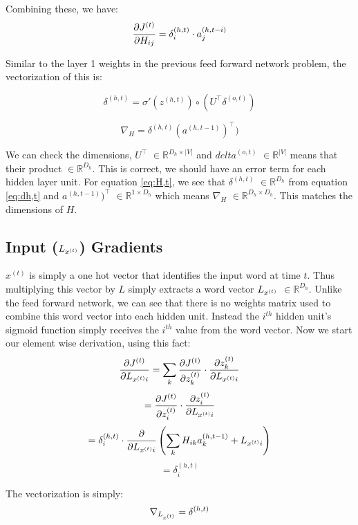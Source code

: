 \documentclass[]{article}
\newcommand{\deriv}[2]{%
	\ensuremath{\frac{\partial {#1}}{\partial {#2}}}}
\newcommand{\slayer}[3]{ %
	\ensuremath{{#1}^{(#2)}_{#3}}}
\newcommand{\vlayer}[2]{ %
	\ensuremath{{#1}^{(#2)}}}
\newcommand{\reals}[1]{ %
	\ensuremath{\in \mathbb{R}^{#1}}}
\begin{document}
Combining these, we have:
$$\deriv{\vlayer{J}{t}}{H_{ij}} = \slayer{\delta}{h,t}{i} \cdot \slayer{a}{h,t-i}{j}$$

Similar to the layer 1 weights in the previous feed forward network problem, the vectorization of this is:

\begin{equation} \label{eq:dh,t}
\vlayer{\delta}{h,t} = \sigma'(\vlayer{z}{h,t}) \circ (U^\top \vlayer{\delta}{o,t})
\end{equation}

\begin{equation} \label{eq:H,t}
\nabla_H = \vlayer{\delta}{h,t} (\vlayer{a}{h,t-1})^\top)
\end{equation}

We can check the dimensions, $U^\top$\reals{D_h\times|V|} and\vlayer{delta}{o,t}\reals{|V|} means that their product\reals{D_h}. This is correct, we should have an error term for each hidden layer unit. For equation \ref{eq:H,t}, we see that \vlayer{\delta}{h,t}\reals{D_h} from equation \ref{eq:dh,t} and $\vlayer{a}{h,t-1})^\top$\reals{1 \times D_h} which means $\nabla_H$\reals{D_h \times D_h}. This matches the dimensions of $H$.

\subsection{Input ($L_{\vlayer{x}{t}}$) Gradients}
\vlayer{x}{t} is simply a one hot vector that identifies the input word at time $t$. Thus multiplying this vector by $L$ simply extracts a word vector $L_{\vlayer{x}{t}}$\reals{D_h}. Unlike the feed forward network, we can see that there is no weights matrix used to combine this word vector into each hidden unit. Instead the $i^{th}$ hidden unit's sigmoid function simply receives the $i^{th}$ value from the word vector. Now we start our element wise derivation, using this fact:
$$\deriv{\vlayer{J}{t}}{L_{\vlayer{x}{t}i}} = \sum_k \deriv{\vlayer{J}{t}}{\slayer{z}{t}{k}} \cdot \deriv{\slayer{z}{t}{k}}{L_{\vlayer{x}{t}i}}$$
$$ = \deriv{\vlayer{J}{t}}{\slayer{z}{t}{i}} \cdot \deriv{\slayer{z}{t}{i}}{L_{\vlayer{x}{t}i}}$$
$$ = \slayer{\delta}{h,t}{i} \cdot \deriv{}{L_{\vlayer{x}{t}i}}\left( \sum_k H_{ik}\slayer{a}{h,t-1}{k} + L_{\vlayer{x}{t}i} \right)$$
$$ = \slayer{\delta}{h,t}{i}$$

The vectorization is simply:
\begin{equation} \label{eq:L,t}
\nabla_{L_{\vlayer{x}{t}}} = \vlayer{\delta}{h,t}
\end{equation}
\end{document}
